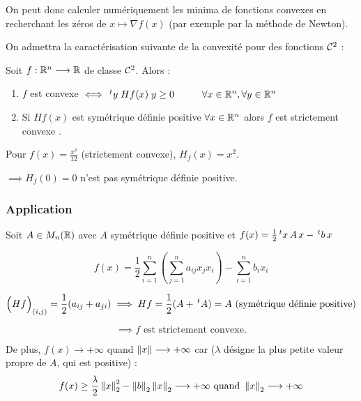 \begin{remark}
    On peut donc calculer numériquement les minima de fonctions convexes en recherchant
    les zéros de $x \mapsto \nabla f(x)$ (par exemple par la méthode de Newton).

    On admettra la caractérisation suivante de la convexité pour des fonctions $\mathcal{C}^2$ :
\end{remark}

\begin{lemme}
    Soit $f : \mathbb{R}^n \longrightarrow \mathbb{R}$ de classe $\mathcal{C}^2$. Alors :

    \begin{enumerate}[label=•]
        \item $f$ est convexe $\iff \,^ty \; Hf(x) \; y \geq 0 \hspace{1cm} \forall x \in \mathbb{R}^n, \forall y \in \mathbb{R}^n$

        \item Si $Hf(x)$ est symétrique définie positive $\forall x \in \mathbb{R}^n$ alors $f$ est strictement convexe \footnotemark.
    \end{enumerate}
\end{lemme}

\begin{remark}
    Pour $f(x) = \frac{x^4}{12}$ (strictement convexe), $H_f(x) = x^2$.

    $\implies H_f(0) = 0$ n'est pas symétrique définie positive.
\end{remark}

\subsubsection*{Application}
Soit $A \in M_n(\mathbb{R})$ avec $A$ symétrique définie positive et $f(x)=\frac{1}{2} \,^tx \, A \, x - \,^tb \, x$

\[
    f(x) = \frac{1}{2} \sum_{i=1}^n \left( \sum_{j=1}^n a_{ij}x_j x_i \right) - \sum_{i=1}^n b_i x_i
\]

\[
    \Big( Hf \Big)_{(i,j)} = \frac{1}{2}(a_{ij} + a_{ji}) \implies
    Hf = \frac{1}{2}(A + \,^tA) = A \text{ (symétrique définie positive)}
\]

\[
    \implies f \text{ est strictement convexe.}
\]

De plus, $f(x) \longrightarrow +\infty$ quand $\left\lVert x\right\rVert \longrightarrow +\infty$ car ($\lambda$ désigne
la plus petite valeur propre de $A$, qui est positive) :
\[
    f(x) \geq \frac{\lambda}{2} \left\lVert x\right\rVert^2_2 - \left\lVert b\right\rVert_2 \left\lVert x\right\rVert_2 \longrightarrow +\infty \text{ quand } \left\lVert x\right\rVert_2 \longrightarrow +\infty
\]

